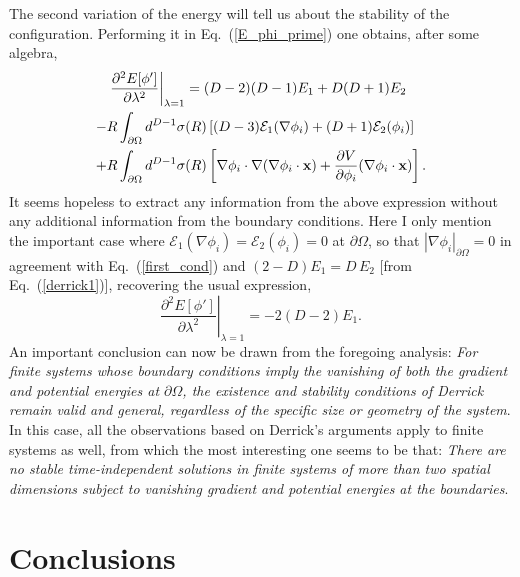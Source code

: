 \documentclass[a4paper,prd,twocolumn,showpacs,amsmath]{revtex4}
\newcommand{\vecx}{{\bf x}}
\newcommand{\domega}{\partial \Omega}
\newcommand{\E}{{\mathcal E}}
\begin{document}
The second variation of the energy will tell us about the stability of the configuration. Performing
it in Eq.~(\ref{E_phi_prime}) one obtains, after some algebra,
\begin{align} \label{derrick2}
  \left.\frac{\partial^2 E[\phi']}{\partial \lambda^2}\right|_{\lambda=1} & = (D-2)(D-1)E_1+D(D+1)E_2 \nonumber \\
    - R \int_{\domega} d^{D-1}\sigma&(R) \left[ (D-3) \E_1(\nabla \phi_i) + (D+1) \E_2(\phi_i) \right] \nonumber \\
    + R \int_{\domega} d^{D-1}\sigma&(R) \left[ \nabla\phi_i\cdot\nabla(\nabla\phi_i\cdot\vecx) +
                                  \frac{\partial V}{\partial \phi_i} (\nabla\phi_i\cdot\vecx) \right].
\end{align}
It seems hopeless to extract any information from the above expression without any additional
information from the boundary conditions. Here I only mention the important case where
$\E_1(\nabla\phi_i)=\E_2(\phi_i)=0$ at $\domega$, so that $|\nabla\phi_i|_{\domega}=0$ in agreement with
Eq.~(\ref{first_cond}) and $(2-D)E_1=D\,E_2$ [from Eq.~(\ref{derrick1})], recovering the usual expression,
\begin{equation} \label{derrick2b}
  \left.\frac{\partial^2 E[\phi']}{\partial \lambda^2}\right|_{\lambda=1} = -2(D-2)E_1.
\end{equation}
An important conclusion can now be drawn from the foregoing analysis: {\em For finite systems
whose boundary conditions imply the vanishing of both the gradient and potential energies at $\domega$, the
existence and stability conditions of Derrick remain valid and general, regardless of the specific size
or geometry of the system}. In this case, all the observations based on Derrick's arguments apply
to finite systems as well, from which the most interesting one seems to be that: {\em There are no stable
time-independent solutions in finite systems of more than two spatial dimensions subject to vanishing
gradient and potential energies at the boundaries}.

\section{Conclusions} \label{concl}
\end{document}
